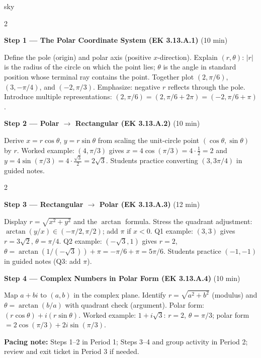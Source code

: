 \documentclass[10pt]{article}
\begin{document}
\begin{skillbox}{sky}
\begin{multicols}{2}

\textbf{Step 1 --- The Polar Coordinate System (EK 3.13.A.1)} (10 min)

Define the pole (origin) and polar axis (positive $x$-direction). Explain
$(r,\theta)$: $|r|$ is the radius of the circle on which the point lies;
$\theta$ is the angle in standard position whose terminal ray contains the point.
Together plot $(2,\pi/6)$, $(3,-\pi/4)$, and $(-2,\pi/3)$. Emphasize: negative
$r$ reflects through the pole. Introduce multiple representations:
$(2,\pi/6) = (2,\pi/6+2\pi) = (-2,\pi/6+\pi)$.

\columnbreak

\textbf{Step 2 --- Polar $\to$ Rectangular (EK 3.13.A.2)} (10 min)

Derive $x = r\cos\theta$, $y = r\sin\theta$ from scaling the unit-circle point
$(\cos\theta, \sin\theta)$ by $r$.
Worked example: $(4,\pi/3)$ gives
$x = 4\cos(\pi/3) = 4 \cdot \tfrac{1}{2} = 2$ and
$y = 4\sin(\pi/3) = 4 \cdot \tfrac{\sqrt{3}}{2} = 2\sqrt{3}$.
Students practice converting $(3, 3\pi/4)$ in guided notes.

\end{multicols}

\begin{multicols}{2}

\textbf{Step 3 --- Rectangular $\to$ Polar (EK 3.13.A.3)} (12 min)

Display $r = \sqrt{x^2+y^2}$ and the $\arctan$ formula. Stress the quadrant
adjustment: $\arctan(y/x) \in (-\pi/2,\pi/2)$; add $\pi$ if $x < 0$.
Q1 example: $(3,3)$ gives $r = 3\sqrt{2}$, $\theta = \pi/4$.
Q2 example: $(-\sqrt{3},1)$ gives $r = 2$,
$\theta = \arctan(1/(-\sqrt{3}))+\pi = -\pi/6+\pi = 5\pi/6$.
Students practice $(-1,-1)$ in guided notes (Q3: add $\pi$).

\columnbreak

\textbf{Step 4 --- Complex Numbers in Polar Form (EK 3.13.A.4)} (10 min)

Map $a+bi$ to $(a,b)$ in the complex plane. Identify $r = \sqrt{a^2+b^2}$
(modulus) and $\theta = \arctan(b/a)$ with quadrant check (argument).
Polar form: $(r\cos\theta)+i(r\sin\theta)$.
Worked example: $1+i\sqrt{3}$: $r = 2$, $\theta = \pi/3$;
polar form $= 2\cos(\pi/3)+2i\sin(\pi/3)$.

\end{multicols}

\smallskip
\textbf{Pacing note:} Steps 1--2 in Period 1; Steps 3--4 and group activity
in Period 2; review and exit ticket in Period 3 if needed.
\end{skillbox}
\end{document}
